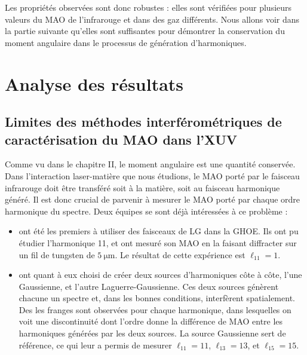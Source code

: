 Les propriétés observées sont donc robustes : elles sont vérifiées pour plusieurs valeurs du MAO de l'infrarouge et dans des gaz différents. Nous allons voir dans la partie suivante qu'elles sont suffisantes pour démontrer la conservation du moment angulaire dans le processus de génération d'harmoniques.

\chapter{Analyse des résultats}
\section{Limites des méthodes interférométriques de caractérisation du MAO dans l'XUV}
Comme vu dans le chapitre II, le moment angulaire est une quantité conservée. Dans l'interaction laser-matière que nous étudions, le MAO porté par le faisceau infrarouge doit être transféré soit à la matière, soit au faisceau harmonique généré. Il est donc crucial de parvenir à mesurer le MAO porté par chaque ordre harmonique du spectre. Deux équipes se sont déjà intéressées à ce problème :

\begin{itemize} 
\item {} ont été les premiers à utiliser des faisceaux de LG dans la GHOE. Ils ont pu étudier l'harmonique 11, et ont mesuré son MAO en la faisant diffracter sur un fil de tungsten de $\SI{5}{\micro\m}$. Le résultat de cette expérience est $\ell_{11}=1$.\\
\item {} ont quant à eux choisi de créer deux sources d'harmoniques côte à côte, l'une Gaussienne, et l'autre Laguerre-Gaussienne. Ces deux sources génèrent chacune un spectre et, dans les bonnes conditions, interfèrent spatialement. Des les franges sont observées pour chaque harmonique, dans lesquelles on voit une discontinuité dont l'ordre donne la différence de MAO entre les harmoniques générées par les deux sources. La source Gaussienne sert de référence, ce qui leur a permis de mesurer $\ell_{11}=11$, $\ell_{13}=13$, et $\ell_{15}=15$.\\
\end{itemize}

